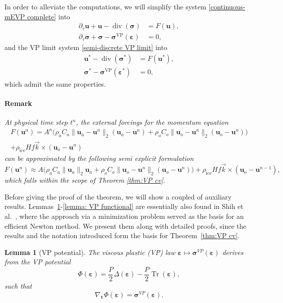 \documentclass[11pt]{article}
\newtheorem{lemma}[theorem]{Lemma}
\newcommand{\bu}{\mathbf{u}}
\newcommand{\sig}{\boldsymbol{\sigma}}
\newcommand{\beps}{\boldsymbol{\varepsilon}}
\begin{document}
In order to alleviate the computations, we will simplify the system \eqref{continuous-mEVP complete} into
\begin{equation}
\begin{aligned}
\partial_\tau \bu+ \bu- \operatorname{div}(\sig)&=F(\bu), \\
\partial_\tau \sig+\sig-\sig^{\mathrm{VP}}(\beps)&=0,
\end{aligned}
\label{continuous-mEVP short}
\end{equation}and the VP limit system \eqref{semi-discrete VP limit} into 
\begin{equation}
\begin{aligned}
\bu^* -\operatorname{div}(\sig^*)&=F(\bu^*), \\
\sig^*-\sig^{\mathrm{VP}}(\beps^*)&=0,
\end{aligned}
\label{semi-discrete VP limit short}
\end{equation}
which admit the same properties.

\paragraph{Remark} \textit{At physical time step $t^n$, the external forcings for the momentum equation
\begin{multline}
F(\bu^n) = A^n\big(\rho_a C_a\|\bu_a-\bu^n\|_2(\bu_a-\bu^n)+ \rho_o C_o\|\bu_o-\bu^n\|_2(\bu_o-\bu^n) \big)\\
+ \rho_\text{ice} H f\vec k\times(\bu_o-\bu^n)
\end{multline}
can be approximated by the following semi explicit formulation
\begin{equation}\label{approx forces}
F(\bu^n) \approx A\big (\rho_a C_a\|\bu_a\|_2\bu_a+ \rho_o C_o\|\bu_o-\bu^n\|_2(\bu_o-\bu^n) \big ) 
+ \rho_\text{ice} H f\vec k\times(\bu_o-\bu^{n-1}),
\end{equation}
%
which falls within the scope of Theorem \ref{thm:VP cv}.}


Before giving the proof of the theorem, we will show a coupled of auxiliary results. 
Lemmas~\ref{lemma:VP potential}-\ref{lemma: VP functional} are essentially also found in Shih et al.~\cite{Shih2023}, where the approach via a minimization problem served as the basis for an efficient Newton method. We present them along with detailed proofs, since the results and the notation introduced form the basis for Theorem~\ref{thm:VP cv}.

\begin{lemma}[VP potential]
\label{lemma:VP potential}
    The viscous plastic (VP) law $\beps \mapsto \sig^{VP}(\beps)$ derives from the VP potential
    \begin{equation}
        \Phi(\beps)=\frac{P}{2}\Delta(\beps)- \frac{P}{2}\operatorname{Tr}(\beps),
    \end{equation}
such that
\begin{equation}
    \nabla_{\beps} \Phi(\beps)=\sig^{VP}(\beps).
\end{equation}
\end{lemma}
\end{document}

